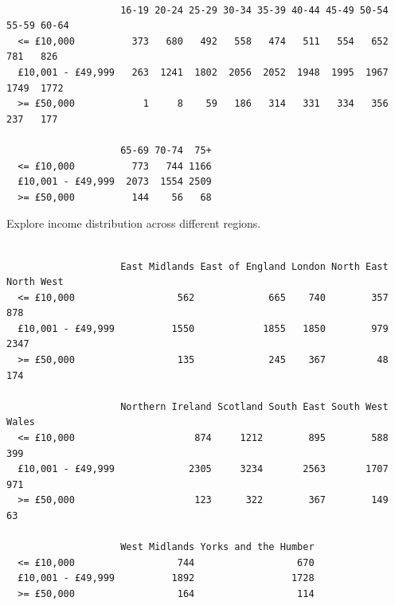 \documentclass[
  letterpaper,
  DIV=11,
  numbers=noendperiod]{scrreprt}
\newenvironment{Shaded}{\begin{snugshade}}{\end{snugshade}}
\newcommand{\CommentTok}[1]{\textcolor[rgb]{0.37,0.37,0.37}{#1}}
\newcommand{\FunctionTok}[1]{\textcolor[rgb]{0.28,0.35,0.67}{#1}}
\newcommand{\NormalTok}[1]{\textcolor[rgb]{0.00,0.23,0.31}{#1}}
\newcommand{\SpecialCharTok}[1]{\textcolor[rgb]{0.37,0.37,0.37}{#1}}
\begin{document}
\begin{Shaded}
\end{Shaded}

\begin{verbatim}
                   
                    16-19 20-24 25-29 30-34 35-39 40-44 45-49 50-54 55-59 60-64
  <= £10,000          373   680   492   558   474   511   554   652   781   826
  £10,001 - £49,999   263  1241  1802  2056  2052  1948  1995  1967  1749  1772
  >= £50,000            1     8    59   186   314   331   334   356   237   177
                   
                    65-69 70-74  75+
  <= £10,000          773   744 1166
  £10,001 - £49,999  2073  1554 2509
  >= £50,000          144    56   68
\end{verbatim}

Explore income distribution across different regions.

\begin{Shaded}
\end{Shaded}

\begin{verbatim}
                   
                    East Midlands East of England London North East North West
  <= £10,000                  562             665    740        357        878
  £10,001 - £49,999          1550            1855   1850        979       2347
  >= £50,000                  135             245    367         48        174
                   
                    Northern Ireland Scotland South East South West Wales
  <= £10,000                     874     1212        895        588   399
  £10,001 - £49,999             2305     3234       2563       1707   971
  >= £50,000                     123      322        367        149    63
                   
                    West Midlands Yorks and the Humber
  <= £10,000                  744                  670
  £10,001 - £49,999          1892                 1728
  >= £50,000                  164                  114
\end{verbatim}
\end{document}
